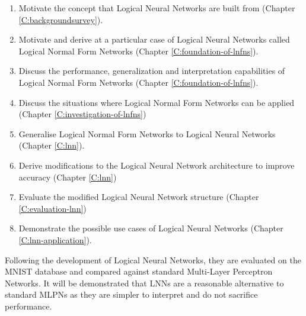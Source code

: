 \begin{enumerate}
	\item Motivate the concept that Logical Neural Networks are built from (Chapter \ref{C:backgroundsurvey}).
	\item Motivate and derive at a particular case of Logical Neural Networks called Logical Normal Form Networks (Chapter \ref{C:foundation-of-lnfns}).
	\item Discuss the performance, generalization and interpretation capabilities of Logical Normal Form Networks (Chapter \ref{C:foundation-of-lnfns}).
	\item Discuss the situations where Logical Normal Form Networks can be applied (Chapter \ref{C:investigation-of-lnfns})
	\item Generalise Logical Normal Form Networks to Logical Neural Networks (Chapter \ref{C:lnn}).
	\item Derive modifications to the Logical Neural Network architecture to improve accuracy (Chapter \ref{C:lnn})
	\item Evaluate the modified Logical Neural Network structure (Chapter \ref{C:evaluation-lnn})
	\item Demonstrate the possible use cases of Logical Neural Networks (Chapter \ref{C:lnn-application}).
\end{enumerate}

Following the development of Logical Neural Networks, they are evaluated on the MNIST database and compared against standard Multi-Layer Perceptron Networks. It will be demonstrated that LNNs are a reasonable alternative to standard MLPNs as they are simpler to interpret and do not sacrifice performance.